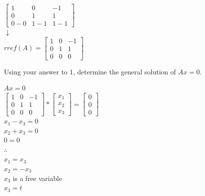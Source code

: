 \documentclass[12pt,letterpaper, onecolumn]{exam}
\begin{document}
\begin{questions}
\begin{solution}
\begin{center}
            $\begin{bmatrix}
                1 & 0 & -1 \\
                0 & 1 & 1 \\
                0 - 0 & 1 - 1 & 1 - 1
            \end{bmatrix}$
            \\$\downarrow$\\
            $rref(A) =
            \begin{bmatrix}
                1 & 0 & -1 \\
                0 & 1 & 1 \\
                0 & 0 & 0
            \end{bmatrix}$
        \end{center}
        
    \end{solution}
    \pagebreak

    \question Using your answer to 1, determine the general solution of $Ax = 0$.    
    \begin{solution}
        \begin{center}
            $Ax=0$\\
            $\begin{bmatrix}
                1 & 0 & -1 \\
                0 & 1 & 1 \\
                0 & 0 & 0
            \end{bmatrix}
            *
            \begin{bmatrix}
                x_1\\
                x_2\\
                x_3
            \end{bmatrix}
            =
            \begin{bmatrix}
                0\\
                0\\
                0
            \end{bmatrix}$\\
            $x_1 - x_3 = 0$\\
            $x_2 + x_3 = 0$\\
            $0 = 0$\\
            $\therefore$\\
            $x_1 = x_3$\\
            $x_2 = -x_3$\\
            $x_3$ is a free variable\\
            $x_3 = t$\\


\end{center}
\end{solution}
\end{questions}
\end{document}
